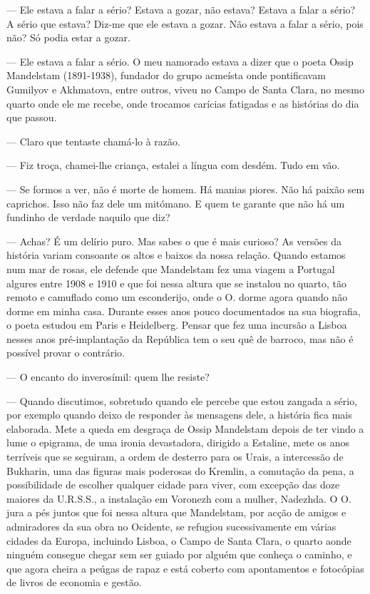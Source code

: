 --- Ele estava a falar a sério? Estava a gozar, não estava? Estava a falar
  a sério? A sério que estava? Diz-me que ele estava a gozar. Não estava
  a falar a sério, pois não? Só podia estar a gozar.

--- Ele estava a falar a sério. O meu namorado estava a dizer que o poeta
  Ossip Mandelstam (1891-1938), fundador do grupo acmeísta onde
  pontificavam Gumilyov e Akhmatova, entre outros, viveu no Campo de
  Santa Clara, no mesmo quarto onde ele me recebe, onde trocamos
  carícias fatigadas e as histórias do dia que passou.

--- Claro que tentaste chamá-lo à razão.

--- Fiz troça, chamei-lhe criança, estalei a língua com desdém. Tudo em
  vão.

--- Se formos a ver, não é morte de homem. Há manias piores. Não há paixão
  sem caprichos. Isso não faz dele um mitómano. E quem te garante que
  não há um fundinho de verdade naquilo que diz?

--- Achas? É um delírio puro. Mas sabes o que é mais
curioso? As versões da história variam consoante os altos e baixos da
nossa relação. Quando estamos num mar de rosas, ele defende que
Mandelstam fez uma viagem a Portugal algures entre 1908 e 1910 e que foi
nessa altura que se instalou no quarto, tão remoto e camuflado como um
esconderijo, onde o
O. dorme agora quando não dorme em minha casa. Durante esses anos pouco
documentados na sua biografia, o poeta estudou em Paris e Heidelberg.
Pensar que fez uma incursão a Lisboa nesses anos pré-implantação da
República tem o seu quê de barroco, mas não é possível provar o
contrário.

--- O encanto do inverosímil: quem lhe resiste?

--- Quando discutimos, sobretudo quando ele percebe que estou zangada a
  sério, por exemplo quando deixo de responder às mensagens dele, a
  história fica mais elaborada. Mete a queda em desgraça de Ossip
  Mandelstam depois de ter vindo a lume o epigrama, de uma ironia
  devastadora, dirigido a Estaline, mete os anos terríveis que se
  seguiram, a ordem de desterro para os Urais, a intercessão de
  Bukharin, uma das figuras mais poderosas do Kremlin, a comutação da
  pena, a possibilidade de escolher qualquer cidade para viver, com
  excepção das doze maiores da U.R.S.S., a instalação em Voronezh com a
  mulher, Nadezhda. O O. jura a pés juntos que foi nessa altura que
  Mandelstam, por acção de amigos e admiradores da sua obra no Ocidente,
  se refugiou sucessivamente em várias cidades da Europa, incluindo
  Lisboa, o Campo de Santa Clara, o quarto aonde ninguém consegue chegar
  sem ser guiado por alguém que conheça o caminho, e que agora cheira a
  peúgas de rapaz e está coberto com apontamentos e fotocópias de livros
  de economia e gestão.

